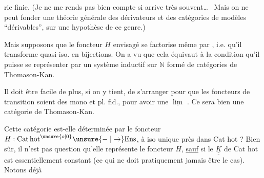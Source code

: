 
rie finie. (Je ne me rends pas bien compte si  arrive très souvent\ldots\ \deleted{\unsure{)}} Mais on ne peut fonder une théorie générale des dérivateurs et des catégories de modèles ``dérivables'', sur une hypothèse de ce genre.)

Mais supposons que le foncteur $H$ envisagé se factorise même par , i.e. qu'il transforme quasi-iso. en bijections. On a vu que cela équivaut à la condition qu'il puisse se représenter par un système inductif sur $\mathbb N$ formé de catégories de Thomason-Kan.

Il doit être facile de plus, si on y tient, de s'arranger pour que les foncteurs de transition soient des mono et pl. fid., pour avoir une $\underline{\lim}$ . Ce sera bien  une catégorie de Thomason-Kan.

Cette catégorie est-elle déterminée par le foncteur $H:\mathrm{Cat\,hot}^{\unsure{o|0}}\unsure{\relbar|\to}\mathrm{Ens}$, à iso unique près  dans Cat hot ? Bien sûr, il n'est pas question qu'elle représente le foncteur $H$, \uline{sauf} si  le   $\underline{\underline K}$ de Cat hot est essentiellement constant (ce qui ne doit pratiquement jamais être le cas). Notons déjà

